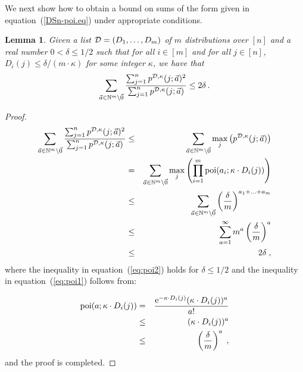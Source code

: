 \documentclass[10pt]{article}
\newtheorem{lemma}[theorem]{Lemma}
\theoremstyle{definition}
\numberwithin{equation}{section}
\newcommand{\eee}{\mathrm e}  %
\newcommand{\poi}{{\rm poi}}
\newcommand{\calD}{{\cal D}}
\newcommand{\BEQ}{\begin{equation}} \newcommand{\EEQ}{\end{equation}}
\newcommand{\BEQN}{\begin{eqnarray}}\newcommand{\EEQN}{\end{eqnarray}}
\newcommand{\BPF}{\begin{proof}} \newcommand {\EPF}{\end{proof}}
\newcommand{\w}{\kappa}
\begin{document}
{We next show how to obtain a bound on sums of the form given in
equation~(\ref{DSn-poi.eq}) under appropriate conditions.
\begin{lemma}\label{eps.lem}
Given a list $\calD = (D_1,\ldots,D_m)$ of $m$ distributions over $[n]$
and a real number $0 < \delta \leq 1/2$ such that for all $i\in\left[m\right]$
and for all $j\in\left[n\right]$,  $D_i(j) \leq {\delta}/{(m\cdot \w)}$
for some integer $\w$, we have that
\BEQ\label{eps.eq}
\sum_{\vec{a}\in \mathbb{N}^m\setminus\vec{0}}
  \frac{\sum_{j=1}^n p^{\calD,\w}(j;\vec{a})^2}{\sum_{j=1}^n p^{\calD,\w}(j;\vec{a})} \leq 2\delta\,.
\EEQ
%
%
\end{lemma}
\BPF
%

\BEQN
\sum_{\vec{a}\in \mathbb{N}^m\setminus\vec{0}}
   \frac{\sum_{j=1}^n p^{\calD,\w}(j;\vec{a})^2}{\sum_{j=1}^n p^{\calD,\w}(j;\vec{a})}
&\leq& \sum_{\vec{a}\in \mathbb{N}^m\setminus\vec{0}} \max_j \left(p^{\calD, \w}(j;\vec{a})\right) \\
&=& \sum_{\vec{a}\in \mathbb{N}^m\setminus\vec{0}}
   \max_j \left(\prod_{i=1}^m \poi(a_i;\w\cdot D_i(j))\right) \\ \label{eq:poi1}
&\leq& \sum_{\vec{a}\in \mathbb{N}^m\setminus\vec{0}} \left(\frac{\delta}{m}\right)^{a_1+\ldots +a_m} \\
&\leq& \sum_{a=1}^{\infty} m^a \left(\frac{\delta}{m}\right)^a \\
&\leq& 2\delta\;,\label{eq:poi2}
\EEQN
where the inequality in equation~(\ref{eq:poi2}) holds for $\delta\leq 1/2$ and the inequality in equation~(\ref{eq:poi1}) follows from:













%
\begin{eqnarray}
\poi(a;\w\cdot D_i(j)) &=& \frac{\eee^{-\w\cdot D_i(j)}(\w\cdot D_i(j))^a}{a!} \\
&\leq& (\w\cdot D_i(j))^a \\
&\leq& \left(\frac{\delta}{m}\right)^a \;,
\end{eqnarray}
and the proof is completed.
\EPF

}
\end{document}
